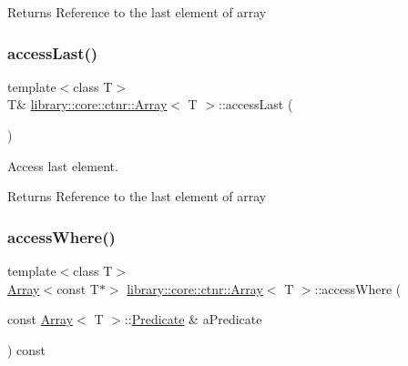 \begin{DoxyReturn}{Returns}
Reference to the last element of array 
\end{DoxyReturn}
\mbox{\label{classlibrary_1_1core_1_1ctnr_1_1_array_ad6ea47ab09dfeebd6de0878d3ad2de25}} 
\subsubsection{\texorpdfstring{accessLast()}{accessLast()}\hspace{0.1cm}{\footnotesize\ttfamily [2/2]}}
{\footnotesize\ttfamily template$<$class T$>$ \\
T\& \mbox{\hyperlink{classlibrary_1_1core_1_1ctnr_1_1_array}{library\+::core\+::ctnr\+::\+Array}}$<$ T $>$\+::access\+Last (\begin{DoxyParamCaption}{ }\end{DoxyParamCaption})}



Access last element. 


\begin{DoxyCode}{0}
\end{DoxyCode}


\begin{DoxyReturn}{Returns}
Reference to the last element of array 
\end{DoxyReturn}
\mbox{\label{classlibrary_1_1core_1_1ctnr_1_1_array_a5359c59d344a6147c7c6ea1012411011}} 
\subsubsection{\texorpdfstring{accessWhere()}{accessWhere()}}
{\footnotesize\ttfamily template$<$class T$>$ \\
\mbox{\hyperlink{classlibrary_1_1core_1_1ctnr_1_1_array}{Array}}$<$const T$\ast$$>$ \mbox{\hyperlink{classlibrary_1_1core_1_1ctnr_1_1_array}{library\+::core\+::ctnr\+::\+Array}}$<$ T $>$\+::access\+Where (\begin{DoxyParamCaption}\item[{const \mbox{\hyperlink{classlibrary_1_1core_1_1ctnr_1_1_array}{Array}}$<$ T $>$\+::\mbox{\hyperlink{classlibrary_1_1core_1_1ctnr_1_1_array_a74cd325a740870aea490b6b739aa06ae}{Predicate}} \&}]{a\+Predicate }\end{DoxyParamCaption}) const}



